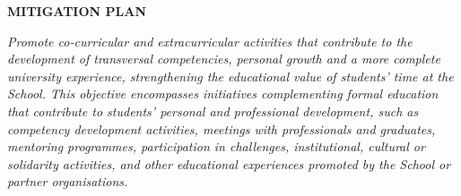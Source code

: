 \documentclass[11pt,a4paper]{scrreprt}
\begin{document}
\begin{tcolorbox}[mitbox]
{\footnotesize\sffamily\bfseries\color{green!40!black} MITIGATION PLAN}\par{}
\end{tcolorbox}
\vspace{8pt}

\newpage
{}
{\small\color{mutedcolor}\itshape Promote co-curricular and extracurricular activities that contribute to the development of transversal competencies, personal growth and a more complete university experience, strengthening the educational value of students' time at the School. This objective encompasses initiatives complementing formal education that contribute to students' personal and professional development, such as competency development activities, meetings with professionals and graduates, mentoring programmes, participation in challenges, institutional, cultural or solidarity activities, and other educational experiences promoted by the School or partner organisations.}\par\vspace{6pt}
\end{document}
